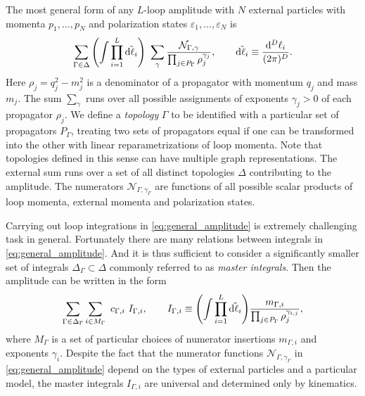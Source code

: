 The most general form of any $L$-loop amplitude with $N$ external particles with momenta $p_1,\ldots,p_N$ and polarization states $\varepsilon_1,\ldots,\varepsilon_N$ is
\begin{equation}
  \sum_{\Gamma \in \Delta} \qty(\int \prod_{i=1}^{L} \tilde{\dd{\ell_i}}) ~ \sum_{\gamma} 
  \frac{\mathcal{N}_{\Gamma,\gamma}%
    }{\prod_{j\in P_\Gamma} \rho_j^{\gamma_{j}}},
    \qquad \tilde{\dd{\ell_i}} \equiv \frac{\dd[D]{\ell_i}}{(2\pi)^{D}}.
  \label{eq:general_amplitude}
\end{equation}
Here $\rho_j = q_j^2 - m_j^2$ is a denominator of a propagator with momentum $q_j$ and mass $m_j$. The sum $\sum_{\gamma}$ runs over all possible assignments
of exponents $\gamma_{j} > 0$ of each propagator $\rho_j$. We define a \emph{topology} $\Gamma$ to be identified with a particular set of propagators $P_\Gamma$,
treating two sets of propagators equal if one can be transformed into the other with linear reparametrizations of loop momenta.
Note that topologies defined in this sense can have multiple graph representations.
The external sum runs over a set of all distinct topologies $\Delta$ contributing to the amplitude.
The numerators $\mathcal{N}_{\Gamma,\gamma_\Gamma}$
are functions of all possible scalar products of loop momenta, external momenta and polarization states.

Carrying out loop integrations in \cref{eq:general_amplitude} is extremely challenging task in general.
Fortunately there are many relations between integrals in \cref{eq:general_amplitude}.
And it is thus sufficient to consider a significantly smaller set of integrals $\Delta_\Gamma \subset \Delta$ commonly referred to
as \emph{master integrals}. Then the amplitude can be written in the form
\begin{equation}
  \sum_{\Gamma \in \Delta_\Gamma} \sum_{i\in M_\Gamma} ~ c_{\Gamma,i} ~ I_{\Gamma,i}, 
    \qquad I_{\Gamma,i} \equiv 
      \qty(\int \prod_{i=1}^{L} \tilde{\dd{\ell_i}}) \frac{m_{\Gamma,i}}{\prod_{j\in P_\Gamma} \rho_j^{\gamma_{i,j}}},
  \label{eq:amplitude_integrated}
\end{equation}
where $M_{\Gamma}$ is a set of particular choices of numerator insertions $m_{\Gamma,i}$ and exponents $\gamma_i$.
Despite the fact that the numerator functions $\mathcal{N}_{\Gamma,\gamma_\Gamma}$ in \cref{eq:general_amplitude} depend on the types of external particles and a particular model,
the master integrals $I_{\Gamma,i}$ are universal and determined only by kinematics.


